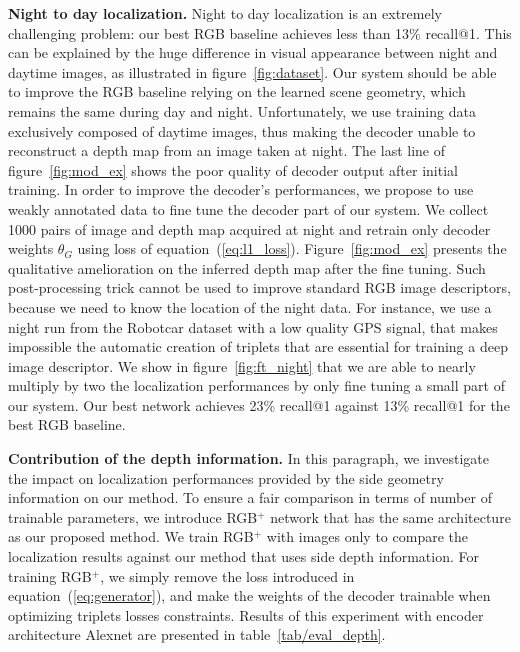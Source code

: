 \vspace{4pt}\noindent\textbf{Night to day localization.} Night to day localization is an extremely challenging problem: our best RGB baseline achieves less than 13\% recall@1. This can be explained by the huge difference in visual appearance between night and daytime images, as illustrated in figure~\ref{fig:dataset}. Our system should be able to improve the RGB baseline relying on the learned scene geometry, which remains the same during day and night. Unfortunately, we use training data exclusively composed of daytime images, thus making the decoder unable to reconstruct a depth map from an image taken at night. The last line of figure~\ref{fig:mod_ex} shows the poor quality of decoder output after initial training. In order to improve the decoder's performances, we propose to use weakly annotated data to fine tune the decoder part of our system. We collect 1000 pairs of image and depth map acquired at night and retrain only decoder weights $\theta_G$ using loss of equation~(\ref{eq:l1_loss}). Figure~\ref{fig:mod_ex} presents the qualitative amelioration on the inferred depth map after the fine tuning. Such post-processing trick cannot be used to improve standard RGB image descriptors, because we need to know the location of the night data. For instance, we use a night run from the Robotcar dataset with a low quality GPS signal, that makes impossible the automatic creation of triplets that are essential for training a deep image descriptor. We show in figure~\ref{fig:ft_night} that we are able to nearly multiply by two the localization performances by only fine tuning a small part of our system. Our best network achieves 23\% recall@1 against 13\% recall@1 for the best RGB baseline.

\vspace{4pt}\noindent\textbf{Contribution of the depth information.} In this paragraph, we investigate the impact on localization performances provided by the side geometry information on our method. To ensure a fair comparison in terms of number of trainable parameters, we introduce RGB$^+$ network that has the same architecture as our proposed method. We train RGB$^+$ with images only to compare the localization results against our method that uses side depth information. For training RGB$^+$, we simply remove the loss introduced in equation~(\ref{eq:generator}), and make the weights of the decoder trainable when optimizing triplets losses constraints. Results of this experiment with encoder architecture Alexnet are presented in table~\ref{tab/eval_depth}.

